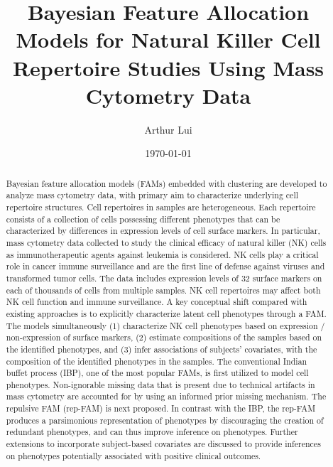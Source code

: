 \documentclass[12pt,]{article}
\title{Bayesian Feature Allocation Models for Natural Killer Cell Repertoire Studies Using Mass Cytometry Data}
\author{Arthur Lui}
\date{\today}
\begin{document}
\maketitle
\onehalfspacing



\begin{abstract}
\noindent
Bayesian feature allocation models (FAMs) embedded with
clustering are developed to analyze mass cytometry data, with primary aim to
characterize underlying cell repertoire structures.   Cell repertoires in
samples are heterogeneous. Each repertoire consists of a collection of cells
possessing different phenotypes that can be characterized by differences in
expression levels of cell surface markers.  In particular, mass cytometry data
collected to study the clinical efficacy of natural killer (NK) cells as
immunotherapeutic agents against leukemia is considered. NK cells play a
critical role in cancer immune surveillance and are the first line of defense
against viruses and transformed tumor cells.  The data includes expression
levels of 32 surface markers on each of thousands of cells from multiple
samples. NK cell repertoires may affect both NK cell function and immune
surveillance.  A key conceptual shift compared with existing approaches is to
explicitly characterize latent cell phenotypes through a FAM.  The models
simultaneously (1) characterize NK cell phenotypes based on expression /
non-expression of surface markers, (2) estimate compositions of the samples
based on the identified phenotypes, and (3) infer associations of subjects'
covariates, with the composition of the identified phenotypes in the samples.
The conventional Indian buffet process (IBP), one of the most popular FAMs, is 
first utilized to model cell phenotypes. Non-ignorable
missing data that is present due to technical artifacts in mass cytometry are
accounted for by using an informed prior missing mechanism. The repulsive FAM
(rep-FAM) is next proposed.  In contrast with the IBP, the rep-FAM produces a
parsimonious representation of phenotypes by discouraging the creation of
redundant phenotypes, and can thus improve inference on phenotypes.  Further
extensions to incorporate subject-based covariates are discussed to provide
inferences on phenotypes potentially associated with positive clinical
outcomes.  

\end{abstract}
\end{document}
